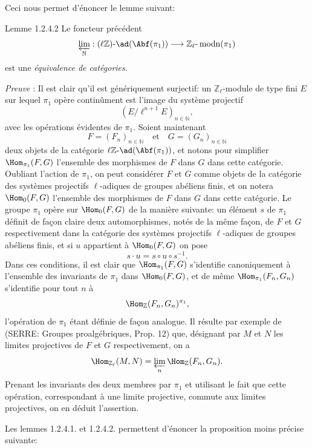 Ceci nous permet d'énoncer le lemme suivant:

\begin{statement}{Lemme 1.2.4.2}
Le foncteur précédent
\[
\varprojlim_{\mathbb{N}}:(\ell\mathbb{Z})\text{-}\ad(\Abf(\pi_1))
\longrightarrow \mathbb{Z}_\ell\text{-}\operatorname{modn}(\pi_1)
\]
est une \emph{équivalence de catégories}.
\end{statement}

\emph{Preuve} : Il est clair qu'il est génériquement surjectif: un \(\mathbb{Z}_\ell\)-module de type fini \(E\) sur lequel \(\pi_1\) opère continûment est l'image du système projectif
\[
(E/\ell^{n+1}E)_{n\in\mathbb{N}},
\]
avec les opérations évidentes de \(\pi_1\). Soient maintenant
\[
F=(F_n)_{n\in\mathbb{N}}\quad\text{et}\quad G=(G_n)_{n\in\mathbb{N}}
\]
deux objets de la catégorie \(\ell\mathbb{Z}\text{-}\ad(\Abf(\pi_1))\), et notons pour simplifier \(\Hom_{\pi_1}(F,G)\) l'ensemble des morphismes de \(F\) dans \(G\) dans cette
catégorie. Oubliant l'action de \(\pi_1\), on peut considérer \(F\) et \(G\) comme objets de la catégorie des systèmes projectifs \(\ell\)-adiques de groupes abéliens finis, et on notera \(\Hom_0(F,G)\) l'ensemble des morphismes de \(F\) dans \(G\) dans cette catégorie. Le groupe \(\pi_1\) opère sur \(\Hom_0(F,G)\) de la manière suivante: un élément \(s\) de \(\pi_1\) définit de façon claire deux automorphismes, notés de la même façon, de \(F\) et \(G\) respectivement dans la catégorie des systèmes projectifs \(\ell\)-adiques de groupes abéliens finis, et si \(u\) appartient à \(\Hom_0(F,G)\) on pose
\[
s\cdot u=s\circ u\circ s^{-1}.
\]
Dans ces conditions, il est clair que \(\Hom_{\pi_1}(F,G)\) s'identifie canoniquement à l'ensemble des invariants de \(\pi_1\) dans \(\Hom_0(F,G)\), et de même \(\Hom_{\pi_1}(F_n,G_n)\) s'identifie pour tout \(n\) à
\[
\Hom_{\mathbb{Z}}(F_n,G_n)^{\pi_1},
\]
l'opération de \(\pi_1\) étant définie de façon analogue. Il résulte par exemple de (SERRE: Groupes proalgébriques, Prop. 12) que, désignant par \(M\) et \(N\) les limites projectives de \(F\) et \(G\) respectivement, on a
\[
\Hom_{\mathbb{Z}_\ell}(M,N)=\varprojlim_n\Hom_{\mathbb{Z}}(F_n,G_n).
\]
Prenant les invariants des deux membres par \(\pi_1\) et utilisant le fait que cette opération, correspondant à une limite projective, commute aux limites projectives, on en déduit l'assertion.

Les lemmes 1.2.4.1. et 1.2.4.2. permettent d'énoncer la proposition moins précise suivante:

